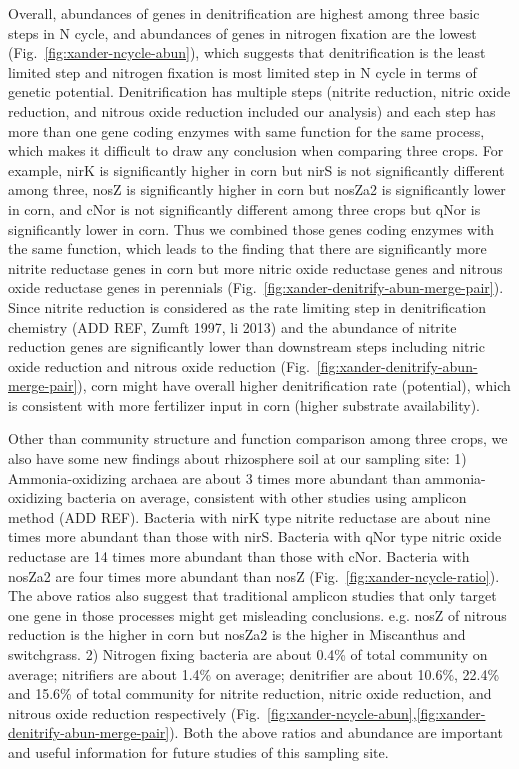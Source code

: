 \documentclass[12pt]{article}
\begin{document}
Overall, abundances of genes in denitrification are highest among three basic steps in N cycle, and abundances of genes in nitrogen fixation are the lowest (Fig.~\ref{fig:xander-ncycle-abun}), which suggests that denitrification is the least limited step and nitrogen fixation is most limited step in N cycle in terms of genetic potential. Denitrification has multiple steps (nitrite reduction, nitric oxide reduction, and nitrous oxide reduction included our analysis) and each step has more than one gene coding enzymes with same function for the same process, which makes it difficult to draw any conclusion when comparing three crops. For example, nirK is significantly higher in corn but nirS is not significantly different among three, nosZ is significantly higher in corn but nosZa2 is significantly lower in corn, and cNor is not significantly different among three crops but qNor is significantly lower in corn. Thus we combined those genes coding enzymes with the same function, which leads to the finding that there are significantly more nitrite reductase genes in corn but more nitric oxide reductase genes and nitrous oxide reductase genes in perennials (Fig.~\ref{fig:xander-denitrify-abun-merge-pair}). Since nitrite reduction is considered as the rate limiting step in denitrification chemistry (ADD REF, Zumft 1997, li 2013) and the abundance of nitrite reduction genes are significantly lower than downstream steps including nitric oxide reduction and nitrous oxide reduction (Fig.~\ref{fig:xander-denitrify-abun-merge-pair}), corn might have overall higher denitrification rate (potential), which is consistent with more fertilizer input in corn (higher substrate availability).

Other than community structure and function comparison among three crops, we also have some new findings about rhizosphere soil at our sampling site: 1) Ammonia-oxidizing archaea are about 3 times more abundant than ammonia-oxidizing bacteria on average, consistent with other studies using amplicon method (ADD REF). Bacteria with nirK type nitrite reductase are about nine times more abundant than those with nirS. Bacteria with qNor type nitric oxide reductase are 14 times more abundant than those with cNor. Bacteria with nosZa2 are four times more abundant than nosZ (Fig.~\ref{fig:xander-ncycle-ratio}). The above ratios also suggest that traditional amplicon studies that only target one gene in those processes might get misleading conclusions. e.g. nosZ of nitrous reduction is the higher in corn but nosZa2 is the higher in Miscanthus and switchgrass. 2) Nitrogen fixing bacteria are about 0.4\% of total community on average; nitrifiers are about 1.4\% on average; denitrifier are about 10.6\%, 22.4\% and 15.6\% of total community for nitrite reduction, nitric oxide reduction, and nitrous oxide reduction respectively (Fig.~\ref{fig:xander-ncycle-abun},\ref{fig:xander-denitrify-abun-merge-pair}). Both the above ratios and abundance are important and useful information for future studies of this sampling site.
\end{document}
